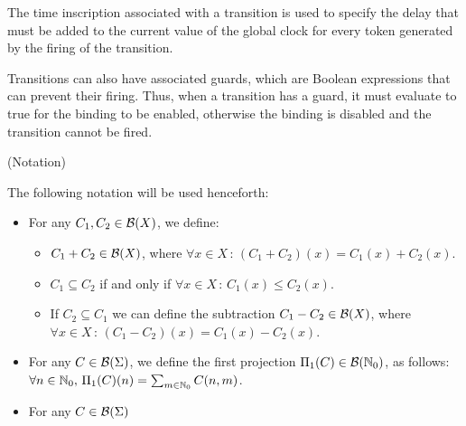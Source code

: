 The time inscription associated with a transition 
is used to specify the delay that must be added to the
current value of the global clock for
every token generated by the firing of the transition.

Transitions can also have associated guards, which
are Boolean expressions that can prevent their firing.
Thus, when a transition has a guard, it must evaluate to
true for the binding to be enabled,
otherwise the binding is disabled and 
the transition cannot be fired. 

\begin{definition} (Notation)

The following notation will be used henceforth:

\vspace*{-0.2cm}

\begin{itemize}
%
%
%
\item For any $C_1, C_2 \in {\cal B}(X)$, we define:
  \begin{itemize}
  \item $C_1 + C_2 \in {\cal B}(X)$, where $\forall x \in X\,:\,
        (C_1+C_2)(x)= C_1(x) + C_2(x)$.
  \item $C_1 \subseteq C_2$ if and only if $\forall x \in X\,:\,
        C_1(x) \leq C_2(x)$.
  \item If $C_2 \subseteq C_1$ we can define the subtraction 
        $C_1 - C_2 \in {\cal B}(X)$, where $\forall x \in X\,:\,
        (C_1-C_2)(x)= C_1(x) - C_2(x)$.
  \end{itemize}
%
\item For any $C \in {\cal B}(\Sigma)$, 
we define the first projection
$\Pi_1(C) \in {\cal B}(\mathbb{N}_{0})$, 
as follows: $\forall n \in \mathbb{N}_{0},\,
\Pi_1(C)(n) = \sum_{m\in \mathbb{N}_{0}} C(n,m)$.
%
\item For any $C \in {\cal B}(\Sigma)$

\end{itemize}
\end{definition}

